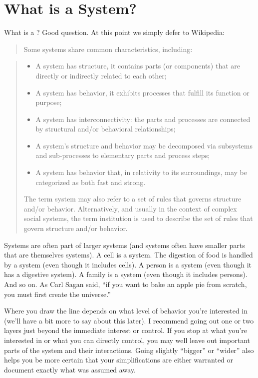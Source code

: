 \documentclass[letterpaper,10pt,english]{sphinxmanual}
\begin{document}
\section{What is a System?}
\label{\detokenize{index:What-is-a-System?}}
What is a ? Good question. At this point we simply defer to Wikipedia:
\begin{quote}

Some systems share common characteristics, including:
\end{quote}
\begin{quote}
\begin{itemize}
\item {} 
A system has structure, it contains parts (or components) that are directly or indirectly related to each other;

\item {} 
A system has behavior, it exhibits processes that fulfill its function or purpose;

\item {} 
A system has interconnectivity: the parts and processes are connected by structural and/or behavioral relationships;

\item {} 
A system’s structure and behavior may be decomposed via subsystems and sub-processes to elementary parts and process steps;

\item {} 
A system has behavior that, in relativity to its surroundings, may be categorized as both fast and strong.

\end{itemize}

The term system may also refer to a set of rules that governs structure and/or behavior. Alternatively, and usually in the context of complex social systems, the term institution is used to describe the set of rules that govern structure and/or behavior.
\end{quote}

Systems are often part of larger systems (and systems often have smaller parts that are themselves systems). A cell is a system. The digestion of food is handled by a system (even though it includes cells). A person is a system (even though it has a digestive system). A family is a system (even though it includes persons). And so on. As Carl Sagan said, “if you want to bake an apple pie from scratch, you must first create the universe.”

Where you draw the line depends on what level of behavior you’re interested in (we’ll have a bit more to say about this later). I recommend going out one or two layers just beyond the immediate interest or control. If you stop at what you’re interested in or what you can directly control, you may well leave out important parts of the system and their interactions. Going slightly “bigger” or “wider” also helps you be more certain that your simplifications are either warranted or document exactly
what was assumed away.
\end{document}
